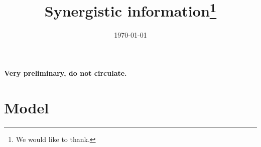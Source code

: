 \documentclass[a4paper]{article}
\begin{document}
\title{Synergistic information\thanks{We would like to thank.}}

\date{\today}


\maketitle

\begin{abstract}

\noindent 

\end{abstract}
 
\textbf{Very preliminary, do not circulate.}

\baselineskip0.7cm



\section{Model}
\end{document}
